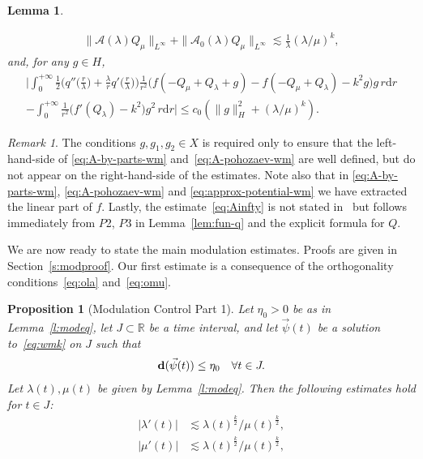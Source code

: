 \documentclass[10pt,reqno]{amsart}
\newcommand{\vd}{\mathrm{d}}
\newcommand{\udr}{\,r\vd r}
\newcommand{\A}{\mathcal{A}}
\newcommand{\R}{\mathbb{R}}
\newcommand{\de}{\delta}
\newcommand{\la}{\lambda}
\newcommand{\abs}[1]{\left\lvert{#1}\right\rvert}
\newcommand{\EQ}[1]{\begin{equation}\begin{split} #1 \end{split}\end{equation}}
\numberwithin{equation}{section}
\newtheorem{lem}[thm]{Lemma}
\newtheorem{prop}[thm]{Proposition}
\theoremstyle{remark}
\newtheorem{rem}[thm]{Remark}
\newcounter{parts}
\newcommand{\0}{\emptyset}
\newcommand{\bfd}{{\bf d}}
\begin{document}
\begin{lem}
\begin{itemize}[leftmargin=0.5cm]
\begin{gather}
    \| \A(\la) Q_\mu \|_{L^\infty} + \| \A_0(\la) Q_\mu \|_{L^\infty}  \lesssim \frac{1}{\la} (\la/ \mu)^k,   \label{eq:Ainfty} 
     \end{gather} 
    and, for any $g \in H$, 
    \begin{multline}   \label{eq:approx-potential-wm}
        \bigg|\int_0^{+\infty}\frac 12 \Big(q''\big(\frac{r}{\lambda}\big) + \frac{\lambda}{r}q'\big(\frac{r}{\lambda}\big)\Big)\frac{1}{r^2}\big(f({-}Q_\mu + Q_\lambda + g) - f({-}Q_\mu + Q_\lambda)-k^2g\big)g \udr \\
        - \int_0^{+\infty} \frac{1}{r^2}\big(f'(Q_\lambda)-k^2\big)g^2 \udr\bigg| \leq c_0(\|g\|_H^2 + (\lambda/\mu)^k).  
  \end{multline} 
  \end{itemize}
\end{lem}
\begin{rem}
  The conditions $g, g_1, g_2 \in X$ is required only to ensure that the left-hand-side of \eqref{eq:A-by-parts-wm} and~\eqref{eq:A-pohozaev-wm} are well defined,
  but do not appear on the right-hand-side of the estimates. Note also that in \eqref{eq:A-by-parts-wm}, \eqref{eq:A-pohozaev-wm} and \eqref{eq:approx-potential-wm}
  we have extracted the linear part of $f$. Lastly, the estimate~\eqref{eq:Ainfty} is not stated in~\cite{JJ-AJM} but follows immediately from  $P$2, $P3$ in Lemma~\ref{lem:fun-q} and the explicit formula for $Q$. 
\end{rem}



 

We are now ready to state the main modulation estimates. Proofs are given in Section~\ref{s:modproof}. Our first  estimate is a consequence of the orthogonality conditions~\eqref{eq:ola} and~\eqref{eq:omu}.  

\begin{prop}[Modulation Control Part 1] \label{p:modp} 
Let $\eta_0>0$ be as in Lemma~\ref{l:modeq}, let $J \subset \R$ be a time interval, and let
$\vec \psi(t)$ be a solution to~\eqref{eq:wmk} on $J$ such that 
\EQ{
\bfd(\vec \psi(t))\le \eta_0 \quad \forall t \in J.
}
Let $\la(t), \mu(t)$ be given by Lemma~\ref{l:modeq}. Then the following estimates hold for $t \in J$:
\begin{align}
\abs{\la'(t)} &\lesssim \la(t)^{\frac{k}{2}}/\mu(t)^\frac k2, \label{eq:la'} \\ 
\abs{ \mu'(t)}& \lesssim \la(t)^{\frac{k}{2}}/\mu(t)^\frac k2,  \label{eq:mu'} 
\end{align} 
\end{prop} 
\end{document}
